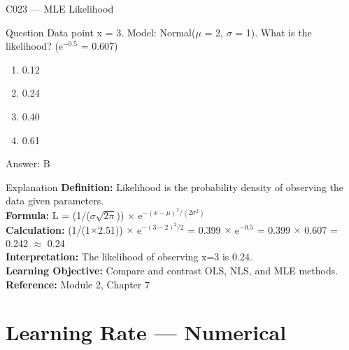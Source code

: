 \documentclass[aspectratio=169,8pt]{beamer}
\begin{document}
	\begin{frame}{C023 --- MLE Likelihood}
		\begin{block}{Question}
			Data point x = 3. Model: Normal($\mu$ = 2, $\sigma$ = 1). What is the likelihood? (e$^{-0.5}$ = 0.607)
			\begin{enumerate}
				\item 0.12
				\item 0.24
				\item 0.40
				\item 0.61
			\end{enumerate}
		\end{block}
		\begin{exampleblock}{Answer: B}\end{exampleblock}
		\begin{block}{Explanation}
			\textbf{Definition:} Likelihood is the probability density of observing the data given parameters.\\
			\textbf{Formula:} L = (1/($\sigma$$\sqrt{2\pi}$)) $\times$ e$^{-(x-\mu)^2/(2\sigma^2)}$\\
			\textbf{Calculation:} (1/(1$\times$2.51)) $\times$ e$^{-(3-2)^2/2}$ = 0.399 $\times$ e$^{-0.5}$ = 0.399 $\times$ 0.607 = 0.242 $\approx$ 0.24\\
			\textbf{Interpretation:} The likelihood of observing x=3 is 0.24.\\
			\textbf{Learning Objective:} Compare and contrast OLS, NLS, and MLE methods.\\
			\textbf{Reference:} Module 2, Chapter 7
		\end{block}
	\end{frame}
	
	\section{Learning Rate --- Numerical}
	
\end{document}
